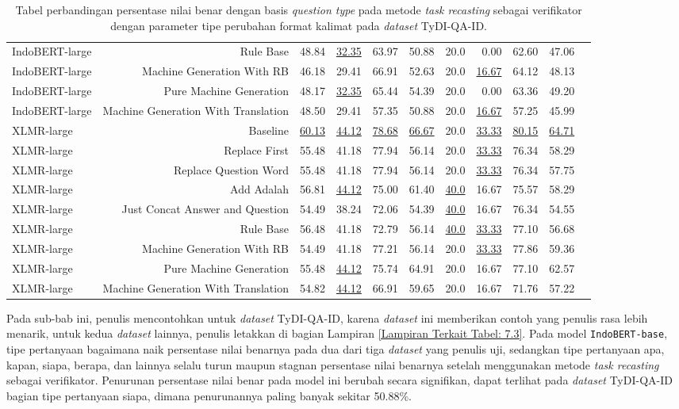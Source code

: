 \begin{table}[H]
\begin{tabular}{lrrrrrrrrrr}
IndoBERT-large &Rule Base &48.84 &\underline{32.35} &63.97 &50.88 &20.0 &0.00 &62.60 &47.06 \\
IndoBERT-large &Machine Generation With RB &46.18 &29.41 &66.91 &52.63 &20.0 &\underline{16.67} &64.12 &48.13 \\
IndoBERT-large &Pure Machine Generation &48.17 &\underline{32.35} &65.44 &54.39 &20.0 &0.00 &63.36 &49.20 \\
IndoBERT-large &Machine Generation With Translation &48.50 &29.41 &57.35 &50.88 &20.0 &\underline{16.67} &57.25 &45.99 \\
\hline
XLMR-large &Baseline &\underline{60.13} &\underline{44.12} &\underline{78.68} &\underline{66.67} &20.0 &\underline{33.33} &\underline{80.15} &\underline{64.71} \\
XLMR-large &Replace First &55.48 &41.18 &77.94 &56.14 &20.0 &\underline{33.33} &76.34 &58.29 \\
XLMR-large &Replace Question Word &55.48 &41.18 &77.94 &56.14 &20.0 &\underline{33.33} &76.34 &57.75 \\
XLMR-large &Add Adalah &56.81 &\underline{44.12} &75.00 &61.40 &\underline{40.0} &16.67 &75.57 &58.29 \\
XLMR-large &Just Concat Answer and Question &54.49 &38.24 &72.06 &54.39 &\underline{40.0} &16.67 &76.34 &54.55 \\
XLMR-large &Rule Base &56.48 &41.18 &72.79 &56.14 &\underline{40.0} &\underline{33.33} &77.10 &56.68 \\
XLMR-large &Machine Generation With RB &54.49 &41.18 &77.21 &56.14 &20.0 &\underline{33.33} &77.86 &59.36 \\
XLMR-large &Pure Machine Generation &55.48 &\underline{44.12} &75.74 &64.91 &20.0 &16.67 &77.10 &62.57 \\
XLMR-large &Machine Generation With Translation &54.82 &\underline{44.12} &66.91 &59.65 &20.0 &16.67 &71.76 &57.22 \\
\bottomrule
\end{tabular}
\caption{Tabel perbandingan persentase nilai benar dengan basis \emph{question type} pada metode \emph{task recasting} sebagai verifikator dengan parameter tipe perubahan format kalimat pada \emph{dataset} TyDI-QA-ID.}
\end{table}

Pada sub-bab ini, penulis mencontohkan untuk \emph{dataset} TyDI-QA-ID, karena \emph{dataset} ini memberikan contoh yang penulis rasa lebih menarik, untuk kedua \emph{dataset} lainnya, penulis letakkan di bagian Lampiran \ref{Lampiran Terkait Tabel: 7.3}. Pada model \texttt{IndoBERT-base}, tipe pertanyaan bagaimana naik persentase nilai benarnya pada dua dari tiga \emph{dataset} yang penulis uji, sedangkan tipe pertanyaan apa, kapan, siapa, berapa, dan lainnya selalu turun maupun stagnan persentase nilai benarnya setelah menggunakan metode \emph{task recasting} sebagai verifikator. Penurunan persentase nilai benar pada model ini berubah secara signifikan, dapat terlihat pada \emph{dataset} TyDI-QA-ID bagian tipe pertanyaan siapa, dimana penurunannya paling banyak sekitar 50.88\%.

